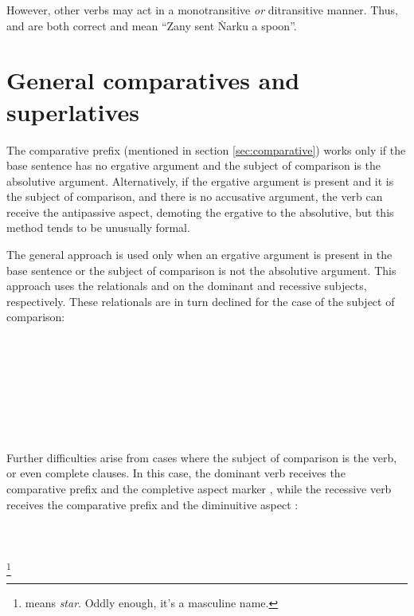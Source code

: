 \documentclass{book}
\begin{document}
However, other verbs may act in a monotransitive \emph{or} ditransitive manner. Thus,  and  are both correct and mean ``Zany sent Ṅarku a spoon''.

\section{General comparatives and superlatives}

The comparative prefix  (mentioned in section \ref{sec:comparative}) works only if the base sentence has no ergative argument and the subject of comparison is the absolutive argument. Alternatively, if the ergative argument is present and it is the subject of comparison, and there is no accusative argument, the verb can receive the antipassive aspect, demoting the ergative to the absolutive, but this method tends to be unusually formal.

The general approach is used only when an ergative argument is present in the base sentence or the subject of comparison is not the absolutive argument. This approach uses the relationals  and  on the dominant and recessive subjects, respectively. These relationals are in turn declined for the case of the subject of comparison: \\
~\\
    \\
    \\
    \\
~\\
    \\
    \\
     \\

Further difficulties arise from cases where the subject of comparison is the verb, or even complete clauses. In this case, the dominant verb receives the comparative prefix  and the completive aspect marker , while the recessive verb receives the comparative prefix and the diminuitive aspect : \\
~\\
     \\
     \\
     \footnote{ means \emph{star}. Oddly enough, it's a masculine name.} \\
\end{document}
